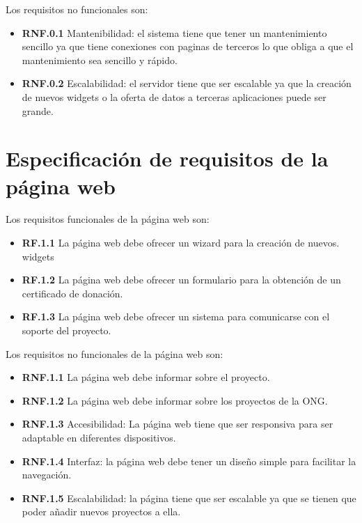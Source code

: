 Los requisitos no funcionales son:

\begin{itemize}
	\item \textbf{RNF.0.1} Mantenibilidad: el sistema tiene que tener un mantenimiento sencillo ya que tiene conexiones con paginas de terceros lo que obliga a que el mantenimiento sea sencillo y rápido.
	\item \textbf{RNF.0.2} Escalabilidad: el servidor tiene que ser escalable ya que la creación de nuevos widgets o la oferta de datos a terceras aplicaciones puede ser grande.
\end{itemize}



\section{Especificación de requisitos de la página web}

Los requisitos funcionales de la página web son:

\begin{itemize}
	\item \textbf{RF.1.1} La página web debe ofrecer un wizard para la creación de nuevos. widgets
	\item \textbf{RF.1.2} La página web debe ofrecer un formulario para la obtención de un certificado de donación.
	\item \textbf{RF.1.3} La página web debe ofrecer un sistema para comunicarse con el soporte del proyecto.
\end{itemize}

Los requisitos no funcionales de la página web son:

\begin{itemize}
	\item \textbf{RNF.1.1} La página web debe informar sobre el proyecto.
	\item \textbf{RNF.1.2} La página web debe informar sobre los proyectos de la ONG.
	\item \textbf{RNF.1.3} Accesibilidad: La página web tiene que ser responsiva para ser adaptable en diferentes dispositivos.
	\item \textbf{RNF.1.4} Interfaz: la página web debe tener un diseño simple para facilitar la navegación.
	\item \textbf{RNF.1.5} Escalabilidad: la página tiene que ser escalable ya que se tienen que poder añadir nuevos proyectos a ella.
\end{itemize}

